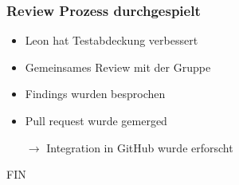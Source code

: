 \begin{frame}
\frametitle{Review Prozess durchgespielt}
\begin{itemize}
\item Leon hat Testabdeckung verbessert
\item Gemeinsames Review mit der Gruppe
\item Findings wurden besprochen
\item Pull request wurde gemerged
\item[$\rightarrow$] Integration in GitHub wurde erforscht
\end{itemize}
\end{frame}

\begin{frame}
\begin{center}
{\Huge FIN}
\end{center}
\end{frame}
